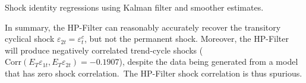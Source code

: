 \documentclass[a4paper,final,12pt]{article}
\begin{document}
\begin{table}[h!]
\vspace{-3mm}
\caption{Shock identity regressions using Kalman filter and smoother
estimates.}
\label{tab:KF}
\end{table}

In summary, the HP-Filter can reasonably accurately recover the transitory
cyclical shock $\varepsilon _{2t}=\varepsilon _{t}^{c}$, but not the
permanent shock. Moreover, the HP-Filter will produce negatively correlated
trend-cycle shocks ($\mathrm{Corr}(E_{T}\varepsilon _{1t},E_{T}\varepsilon
_{2t})=-0.1907$), despite the data being generated from a model that has
zero shock correlation.\ The HP-Filter shock correlation is thus spurious.

\bigskip

\bigskip

\bigskip

\bigskip

\bigskip

\bigskip

\bigskip

\bigskip

\bigskip

\bigskip

\bigskip

\bigskip

\bigskip

\bigskip
\end{document}
